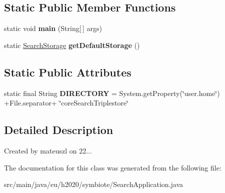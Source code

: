 \subsection*{Static Public Member Functions}
\begin{DoxyCompactItemize}
\item 
static void {\bfseries main} (String\mbox{[}$\,$\mbox{]} args)\hypertarget{classeu_1_1h2020_1_1symbiote_1_1SearchApplication_a2b0c8c4af325bf537ced8a3dd570f5eb}{}\label{classeu_1_1h2020_1_1symbiote_1_1SearchApplication_a2b0c8c4af325bf537ced8a3dd570f5eb}

\item 
static \hyperlink{classeu_1_1h2020_1_1symbiote_1_1search_1_1SearchStorage}{Search\+Storage} {\bfseries get\+Default\+Storage} ()\hypertarget{classeu_1_1h2020_1_1symbiote_1_1SearchApplication_a05ab1920a276d64229ad90d68471b34d}{}\label{classeu_1_1h2020_1_1symbiote_1_1SearchApplication_a05ab1920a276d64229ad90d68471b34d}

\end{DoxyCompactItemize}
\subsection*{Static Public Attributes}
\begin{DoxyCompactItemize}
\item 
static final String {\bfseries D\+I\+R\+E\+C\+T\+O\+RY} = System.\+get\+Property(\char`\"{}user.\+home\char`\"{}) +File.\+separator+ \char`\"{}core\+Search\+Triplestore\char`\"{}\hypertarget{classeu_1_1h2020_1_1symbiote_1_1SearchApplication_a743c407e2c7e2db78f96205fada200e7}{}\label{classeu_1_1h2020_1_1symbiote_1_1SearchApplication_a743c407e2c7e2db78f96205fada200e7}

\end{DoxyCompactItemize}


\subsection{Detailed Description}
Created by mateuszl on 22... 

The documentation for this class was generated from the following file\+:\begin{DoxyCompactItemize}
\item 
src/main/java/eu/h2020/symbiote/Search\+Application.\+java\end{DoxyCompactItemize}
